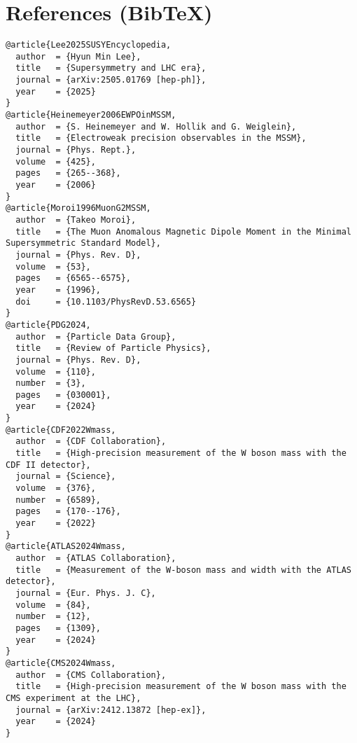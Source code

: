 \documentclass[11pt]{article}
\begin{document}
  \section*{References (Bib\TeX)}
  \begin{verbatim}
@article{Lee2025SUSYEncyclopedia,
  author  = {Hyun Min Lee},
  title   = {Supersymmetry and LHC era},
  journal = {arXiv:2505.01769 [hep-ph]},
  year    = {2025}
}
@article{Heinemeyer2006EWPOinMSSM,
  author  = {S. Heinemeyer and W. Hollik and G. Weiglein},
  title   = {Electroweak precision observables in the MSSM},
  journal = {Phys. Rept.},
  volume  = {425},
  pages   = {265--368},
  year    = {2006}
}
@article{Moroi1996MuonG2MSSM,
  author  = {Takeo Moroi},
  title   = {The Muon Anomalous Magnetic Dipole Moment in the Minimal Supersymmetric Standard Model},
  journal = {Phys. Rev. D},
  volume  = {53},
  pages   = {6565--6575},
  year    = {1996},
  doi     = {10.1103/PhysRevD.53.6565}
}
@article{PDG2024,
  author  = {Particle Data Group},
  title   = {Review of Particle Physics},
  journal = {Phys. Rev. D},
  volume  = {110},
  number  = {3},
  pages   = {030001},
  year    = {2024}
}
@article{CDF2022Wmass,
  author  = {CDF Collaboration},
  title   = {High-precision measurement of the W boson mass with the CDF II detector},
  journal = {Science},
  volume  = {376},
  number  = {6589},
  pages   = {170--176},
  year    = {2022}
}
@article{ATLAS2024Wmass,
  author  = {ATLAS Collaboration},
  title   = {Measurement of the W-boson mass and width with the ATLAS detector},
  journal = {Eur. Phys. J. C},
  volume  = {84},
  number  = {12},
  pages   = {1309},
  year    = {2024}
}
@article{CMS2024Wmass,
  author  = {CMS Collaboration},
  title   = {High-precision measurement of the W boson mass with the CMS experiment at the LHC},
  journal = {arXiv:2412.13872 [hep-ex]},
  year    = {2024}
}
  \end{verbatim}





  \ifdefined\standalonechapter\else
  
\end{document}
